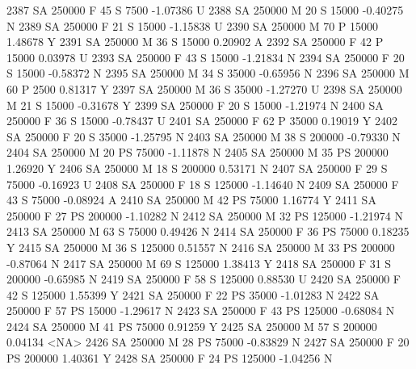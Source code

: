\documentclass{article}
\begin{document}
\begin{Schunk}
\begin{Soutput}
2387     SA     250000   F  45         S   7500  -1.07386    U
2388     SA     250000   M  20         S  15000  -0.40275    N
2389     SA     250000   F  21         S  15000  -1.15838    U
2390     SA     250000   M  70         P  15000   1.48678    Y
2391     SA     250000   M  36         S  15000   0.20902    A
2392     SA     250000   F  42         P  15000   0.03978    U
2393     SA     250000   F  43         S  15000  -1.21834    N
2394     SA     250000   F  20         S  15000  -0.58372    N
2395     SA     250000   M  34         S  35000  -0.65956    N
2396     SA     250000   M  60         P   2500   0.81317    Y
2397     SA     250000   M  36         S  35000  -1.27270    U
2398     SA     250000   M  21         S  15000  -0.31678    Y
2399     SA     250000   F  20         S  15000  -1.21974    N
2400     SA     250000   F  36         S  15000  -0.78437    U
2401     SA     250000   F  62         P  35000   0.19019    Y
2402     SA     250000   F  20         S  35000  -1.25795    N
2403     SA     250000   M  38         S 200000  -0.79330    N
2404     SA     250000   M  20        PS  75000  -1.11878    N
2405     SA     250000   M  35        PS 200000   1.26920    Y
2406     SA     250000   M  18         S 200000   0.53171    N
2407     SA     250000   F  29         S  75000  -0.16923    U
2408     SA     250000   F  18         S 125000  -1.14640    N
2409     SA     250000   F  43         S  75000  -0.08924    A
2410     SA     250000   M  42        PS  75000   1.16774    Y
2411     SA     250000   F  27        PS 200000  -1.10282    N
2412     SA     250000   M  32        PS 125000  -1.21974    N
2413     SA     250000   M  63         S  75000   0.49426    N
2414     SA     250000   F  36        PS  75000   0.18235    Y
2415     SA     250000   M  36         S 125000   0.51557    N
2416     SA     250000   M  33        PS 200000  -0.87064    N
2417     SA     250000   M  69         S 125000   1.38413    Y
2418     SA     250000   F  31         S 200000  -0.65985    N
2419     SA     250000   F  58         S 125000   0.88530    U
2420     SA     250000   F  42         S 125000   1.55399    Y
2421     SA     250000   F  22        PS  35000  -1.01283    N
2422     SA     250000   F  57        PS  15000  -1.29617    N
2423     SA     250000   F  43        PS 125000  -0.68084    N
2424     SA     250000   M  41        PS  75000   0.91259    Y
2425     SA     250000   M  57         S 200000   0.04134 <NA>
2426     SA     250000   M  28        PS  75000  -0.83829    N
2427     SA     250000   F  20        PS 200000   1.40361    Y
2428     SA     250000   F  24        PS 125000  -1.04256    N

\end{Soutput}
\end{Schunk}
\end{document}

